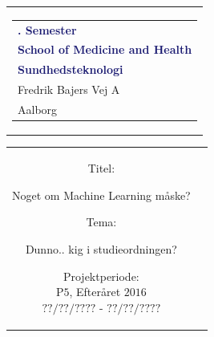 % 
\thispagestyle{empty}
\begin{nopagebreak}
{\samepage 

\begin{tabular}{r}
\parbox{\textwidth}{  
\hfill \hspace{2cm} \parbox{8cm}{\begin{tabular}{l} %
{\small \textbf{\textcolor{MidnightBlue}{{$4$. Semester}}}}\\
{\small \textbf{\textcolor{MidnightBlue}{School of Medicine and Health}}}\\
{\small \textbf{\textcolor{MidnightBlue}{Sundhedsteknologi}}}\\
{\small \textcolor{NavyBlue}{Fredrik Bajers Vej $7$A}} \\
{\small \textcolor{NavyBlue}{$9220$ Aalborg}} \\
\end{tabular}}}
\end{tabular}

\begin{tabular}{cc}
\parbox{7cm}{
\begin{description}

\item {Titel:}

Noget om Machine Learning måske?\\

\item {Tema:} 

\small{
Dunno.. kig i studieordningen?
}

\end{description}

\parbox{8cm}{

\begin{description}
\item {Projektperiode:}\\
   P$5$, Efteråret $2016$\\
   $??/??/????$ - $??/??/????$\\
   

\end{description}}}
\end{tabular}}
\end{nopagebreak}
